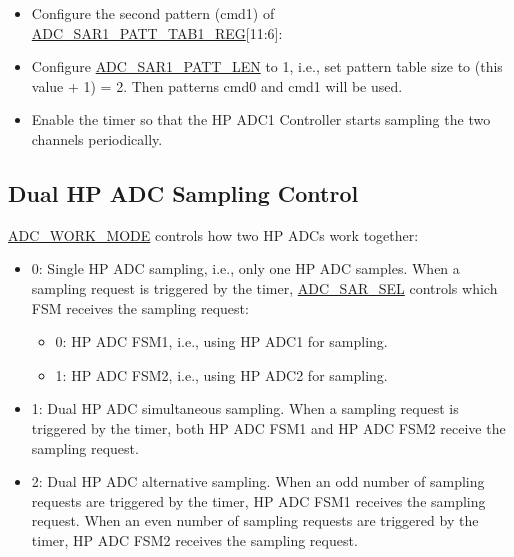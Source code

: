 \documentclass[main\_\_EN.tex]{subfiles}
\begin{document}
\begin{itemize}
    \item Configure the second pattern (cmd1) of \hyperref[regdesc:ADCSAR1PATTTAB1REG]{ADC\_SAR1\_PATT\_TAB1\_REG}[11:6]:

    \centering
    \reglabel{}\regnewline%
    \begin{regdesc}\end{regdesc}
\end{itemize}

\begin{itemize}
    \item Configure \hyperref[fielddesc:ADCSAR1PATTLEN]{ADC\_SAR1\_PATT\_LEN} to 1, i.e., set pattern table size to (this value + 1) = 2. Then patterns cmd0 and cmd1 will be used.
    \item Enable the timer so that the HP ADC1 Controller starts sampling the two channels periodically.
\end{itemize}

\subsection{Dual HP ADC Sampling Control}

\hyperref[fielddesc:ADCWORKMODE]{ADC\_WORK\_MODE} controls how two HP ADCs work together:

\begin{itemize}
    \item 0: Single HP ADC sampling, i.e., only one HP ADC samples. When a sampling request is triggered by the timer, \hyperref[fielddesc:ADCSARSEL]{ADC\_SAR\_SEL} controls which FSM receives the sampling request:

        \begin{itemize}
            \item 0: HP ADC FSM1, i.e., using HP ADC1 for sampling.
            \item 1: HP ADC FSM2, i.e., using HP ADC2 for sampling.
        \end{itemize}

    \item 1: Dual HP ADC simultaneous sampling. When a sampling request is triggered by the timer, both HP ADC FSM1 and HP ADC FSM2 receive the sampling request.
    \item 2: Dual HP ADC alternative sampling. When an odd number of sampling requests are triggered by the timer, HP ADC FSM1 receives the sampling request. When an even number of sampling requests are triggered by the timer, HP ADC FSM2 receives the sampling request.
\end{itemize}
\end{document}
